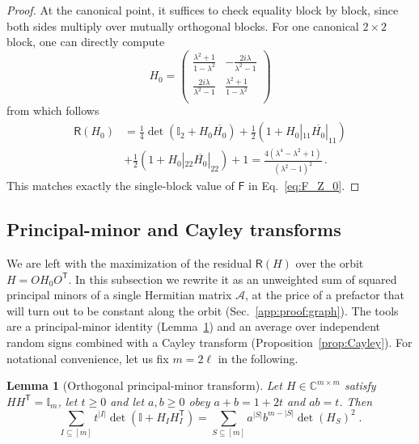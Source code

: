 \documentclass[aps,prl,twocolumn,superscriptaddress,reprint,longbibliography,nofootinbib]{revtex4-2}
\newtheorem{lemma}{Lemma}
\newcommand{\trans}{\mathsf{T}}
\begin{document}
\begin{proof}
At the canonical point, it suffices to check equality block by block, since both sides multiply over mutually orthogonal blocks. For one canonical $2\times2$ block, one can directly compute
\begin{equation}
    H_0= \left(
\begin{array}{cc}
 \frac{\lambda ^2+1}{1-\lambda ^2} & -\frac{2 i \lambda }{\lambda ^2-1} \\
 \frac{2 i \lambda }{\lambda ^2-1} & \frac{\lambda ^2+1}{1-\lambda ^2} \\
\end{array}
\right)
\end{equation}
from which follows
\begin{equation}
\begin{split}
    \mathsf{R}(H_0)&= \frac{1}{4} \det(\mathbb{I}_2+ H_0\overline{H_0}) + \frac{1}{2} (1+ H_0|_{11} \overline{H_0} |_{11} ) \\
    &+ \frac{1}{2} (1+ H_0|_{22} \overline{H_0} |_{22} ) + 1= \frac{4 \left(\lambda ^4-\lambda ^2+1\right)}{\left(\lambda ^2-1\right)^2}\,.
\end{split}
\end{equation}
This matches exactly the single-block value of $\mathsf{F}$ in Eq.~\eqref{eq:F_Z_0}.
\end{proof}
\subsection{Principal-minor and Cayley transforms}
\label{app:proof:cayley}

We are left with the maximization of the residual $\mathsf{R}(H)$ over the orbit $H=OH_0O^{\trans}$. In this subsection we rewrite it as an unweighted sum of squared principal minors of a single Hermitian matrix $\mathcal{A}$, at the price of a prefactor that will turn out to be constant along the orbit (Sec.~\ref{app:proof:graph}). The tools are a principal-minor identity (Lemma~\ref{lem:PMT}) and an average over independent random signs combined with a Cayley transform (Proposition~\ref{prop:Cayley}).
For notational convenience, let us fix $m=2\ell$ in the following. 
\begin{lemma}[Orthogonal principal-minor transform]
\label{lem:PMT}
Let $H\in\mathbb{C}^{m\times m}$ satisfy $HH^{\trans}=\mathbb{I}_m$, let $t\ge0$ and let $a,b\ge0$ obey $a+b=1+2t$ and $ab=t$. Then
\begin{equation}
    \sum_{I\subseteq[m]}t^{|I|}\det\!\left(\mathbb{I}+H_IH_I^{\trans}\right)=\sum_{S\subseteq[m]}a^{|S|}b^{m-|S|}\det(H_S)^2\;.
    \label{eq:PMT}
\end{equation}
\end{lemma}
\end{document}

